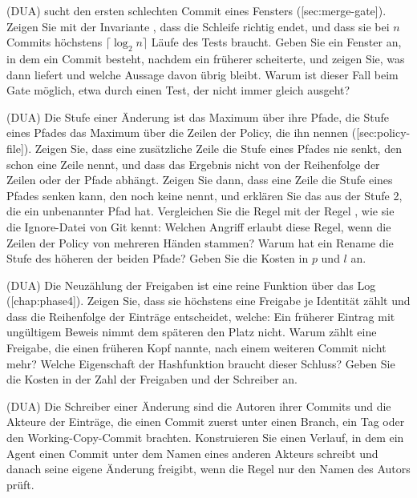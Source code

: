 \startitemize[n]
\item (DUA)  sucht den ersten schlechten Commit eines Fensters
([sec:merge-gate]).
Zeigen Sie mit der Invariante , dass die Schleife richtig endet,
und dass sie bei $n$ Commits höchstens $\lceil \log_2 n \rceil$ Läufe des Tests braucht.
Geben Sie ein Fenster an, in dem ein Commit besteht, nachdem ein früherer scheiterte,
und zeigen Sie, was  dann liefert und welche Aussage davon übrig bleibt.
Warum ist dieser Fall beim Gate möglich, etwa durch einen Test, der nicht immer gleich ausgeht?
\item (DUA) Die Stufe einer Änderung ist das Maximum über ihre Pfade,
die Stufe eines Pfades das Maximum über die Zeilen der Policy, die ihn nennen
([sec:policy-file]).
Zeigen Sie, dass eine zusätzliche Zeile die Stufe eines Pfades nie senkt,
den schon eine Zeile nennt, und dass das Ergebnis nicht von der Reihenfolge der Zeilen
oder der Pfade abhängt.
Zeigen Sie dann, dass eine Zeile die Stufe eines Pfades senken kann, den noch keine nennt,
und erklären Sie das aus der Stufe 2, die ein unbenannter Pfad hat.
Vergleichen Sie die Regel mit der Regel ,
wie sie die Ignore-Datei von Git kennt: Welchen Angriff erlaubt diese Regel,
wenn die Zeilen der Policy von mehreren Händen stammen?
Warum hat ein Rename die Stufe des höheren der beiden Pfade?
Geben Sie die Kosten in $p$ und $l$ an.
\item (DUA) Die Neuzählung der Freigaben ist eine reine Funktion über das Log
([chap:phase4]).
Zeigen Sie, dass sie höchstens eine Freigabe je Identität zählt
und dass die Reihenfolge der Einträge entscheidet, welche:
Ein früherer Eintrag mit ungültigem Beweis nimmt dem späteren den Platz nicht.
Warum zählt eine Freigabe, die einen früheren Kopf nannte, nach einem weiteren Commit nicht mehr?
Welche Eigenschaft der Hashfunktion braucht dieser Schluss?
Geben Sie die Kosten in der Zahl der Freigaben und der Schreiber an.
\item (DUA) Die Schreiber einer Änderung sind die Autoren ihrer Commits
und die Akteure der Einträge, die einen Commit zuerst unter einen Branch, ein Tag
oder den Working-Copy-Commit brachten.
Konstruieren Sie einen Verlauf, in dem ein Agent einen Commit unter dem Namen eines anderen
Akteurs schreibt und danach seine eigene Änderung freigibt,
wenn die Regel nur den Namen des Autors prüft.
